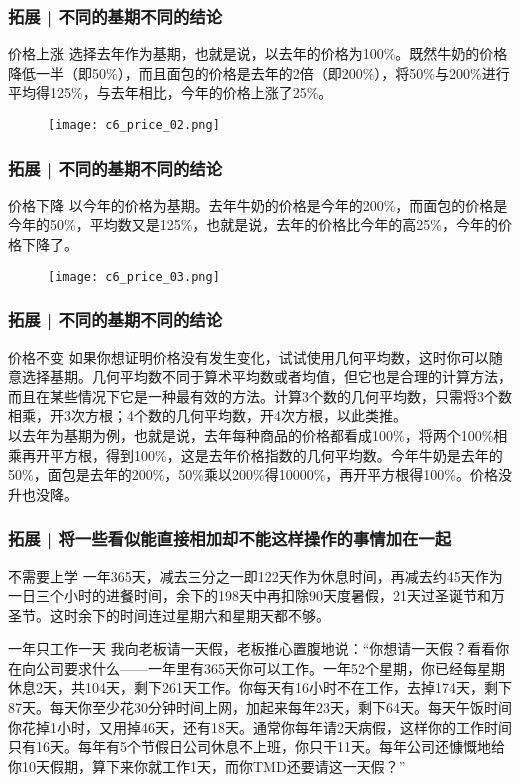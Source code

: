 \begin{frame}
  \frametitle{拓展 | 不同的基期不同的结论}
  \begin{block}{价格上涨}
 选择去年作为基期，也就是说，以去年的价格为100\%。既然牛奶的价格降低一半（即50\%），而且面包的价格是去年的2倍（即200\%），将50\%与200\%进行平均得125\%，与去年相比，今年的价格上涨了25\%。
  \end{block}
  \begin{figure}
    \centering
    \texttt{[image: c6\_price\_02.png]}
  \end{figure}
\end{frame}

\begin{frame}
  \frametitle{拓展 | 不同的基期不同的结论}
  \begin{block}{价格下降}
 以今年的价格为基期。去年牛奶的价格是今年的200\%，而面包的价格是今年的50\%，平均数又是125\%，也就是说，去年的价格比今年的高25\%，今年的价格下降了。
  \end{block}
  \begin{figure}
    \centering
    \texttt{[image: c6\_price\_03.png]}
  \end{figure}
\end{frame}

\begin{frame}
  \frametitle{拓展 | 不同的基期不同的结论}
  \begin{block}{价格不变}
    如果你想证明价格没有发生变化，试试使用几何平均数，这时你可以随意选择基期。几何平均数不同于算术平均数或者均值，但它也是合理的计算方法，而且在某些情况下它是一种最有效的方法。计算3个数的几何平均数，只需将3个数相乘，开3次方根；4个数的几何平均数，开4次方根，以此类推。\\
    \vspace{0.5em}
  以去年为基期为例，也就是说，去年每种商品的价格都看成100\%，将两个100\%相乘再开平方根，得到100\%，这是去年价格指数的几何平均数。今年牛奶是去年的50\%，面包是去年的200\%，50\%乘以200\%得10000\%，再开平方根得100\%。价格没升也没降。
  \end{block}
\end{frame}

\begin{frame}
  \frametitle{拓展 | 将一些看似能直接相加却不能这样操作的事情加在一起}
  \begin{block}{不需要上学}
一年365天，减去三分之一即122天作为休息时间，再减去约45天作为一日三个小时的进餐时间，余下的198天中再扣除90天度暑假，21天过圣诞节和万圣节。这时余下的时间连过星期六和星期天都不够。
  \end{block}
  \pause
  \begin{block}{一年只工作一天}
    我向老板请一天假，老板推心置腹地说：“你想请一天假？看看你在向公司要求什么——一年里有365天你可以工作。一年52个星期，你已经每星期休息2天，共104天，剩下261天工作。你每天有16小时不在工作，去掉174天，剩下87天。每天你至少花30分钟时间上网，加起来每年23天，剩下64天。每天午饭时间你花掉1小时，又用掉46天，还有18天。通常你每年请2天病假，这样你的工作时间只有16天。每年有5个节假日公司休息不上班，你只干11天。每年公司还慷慨地给你10天假期，算下来你就工作1天，而你TMD还要请这一天假？”
  \end{block}
\end{frame}

